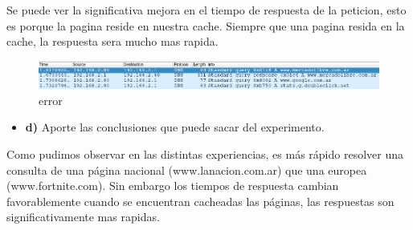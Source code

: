 \documentclass[12pt]{extarticle}
\makeatletter
\def\maxwidth{\ifdim\Gin@nat@width>\linewidth\linewidth
    \else\Gin@nat@width\fi}
\let\Oldincludegraphics\includegraphics
\renewcommand{\includegraphics}[1]{\Oldincludegraphics[width=.8\maxwidth]{#1}}
\providecommand{\tightlist}{%
      \setlength{\itemsep}{0pt}\setlength{\parskip}{0pt}}
\makeatother
\begin{document}
Se puede ver la significativa mejora en el tiempo de respuesta de la
peticion, esto es porque la pagina reside en nuestra cache. Siempre que
una pagina resida en la cache, la respuesta sera mucho mas rapida.

\begin{figure}
\centering
\includegraphics{images/cacheada.png}
\caption{error}
\end{figure}

\begin{itemize}
\tightlist
\item
  \textbf{d)} Aporte las conclusiones que puede sacar del experimento.
\end{itemize}

Como pudimos observar en las distintas experiencias, es más rápido
resolver una consulta de una página nacional (www.lanacion.com.ar) que
una europea (www.fortnite.com). Sin embargo los tiempos de respuesta
cambian favorablemente cuando se encuentran cacheadas las páginas, las
respuestas son significativamente mas rapidas.


    
    



    
    
\end{document}
